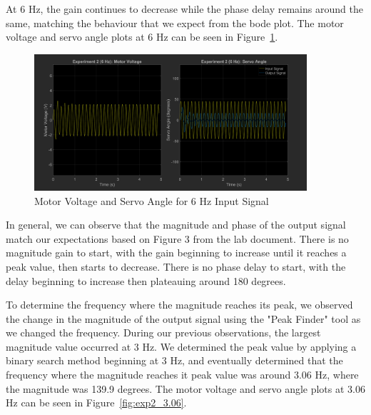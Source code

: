 \documentclass[12pt]{article}
\begin{document}
At 6 Hz, the gain continues to decrease while the phase delay remains around the same, matching the behaviour that we expect from the bode plot. The motor voltage and servo angle plots at 6 Hz can be seen in Figure~\ref{fig:exp2_6}.
\begin{figure}[h!]
    \centering
    \includegraphics[width=0.9\textwidth]{exp2_6}
    \caption{\label{fig:exp2_6}Motor Voltage and Servo Angle for 6 Hz Input Signal}
\end{figure}

In general, we can observe that the magnitude and phase of the output signal match our expectations based on Figure 3 from the lab document. There is no magnitude gain to start, with the gain beginning to increase until it reaches a peak value, then starts to decrease. There is no phase delay to start, with the delay beginning to increase then plateauing around 180 degrees.

To determine the frequency where the magnitude reaches its peak, we observed the change in the magnitude of the output signal using the "Peak Finder" tool as we changed the frequency. During our previous observations, the largest magnitude value occurred at 3 Hz. We determined the peak value by applying a binary search method beginning at 3 Hz, and eventually determined that the frequency where the magnitude reaches it peak value was around 3.06 Hz, where the magnitude was 139.9 degrees. The motor voltage and servo angle plots at 3.06 Hz can be seen in Figure~\ref{fig:exp2_3.06}.
\end{document}
